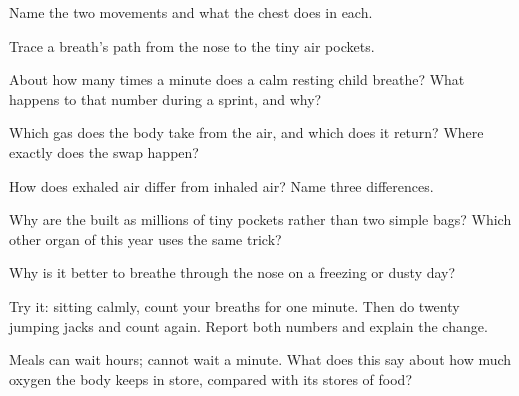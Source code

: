 \begin{exercise}[$\star$]\label{exo:g4:breathing:1}
Name the two  movements and what the chest does in
each.
\end{exercise}

\begin{exercise}[$\star$]\label{exo:g4:breathing:2}
Trace a breath's path from the nose to the tiny air pockets.
\end{exercise}

\begin{exercise}[$\star$]\label{exo:g4:breathing:3}
About how many times a minute does a calm resting child
breathe? What happens to that number during a sprint, and
why?
\end{exercise}

\begin{exercise}[$\star$]\label{exo:g4:breathing:4}
Which gas does the body take from the air, and which does it
return? Where exactly does the swap happen?
\end{exercise}

\begin{exercise}[$\star$]\label{exo:g4:breathing:5}
How does exhaled air differ from inhaled air? Name three
differences.
\end{exercise}

\begin{exercise}[$\star$]\label{exo:g4:breathing:6}
Why are the  built as millions of tiny pockets rather
than two simple bags? Which other organ of this year uses
the same trick?
\end{exercise}

\begin{exercise}[$\star$]\label{exo:g4:breathing:7}
Why is it better to breathe through the nose on a freezing
or dusty day?
\end{exercise}

\begin{exercise}[$\star$]\label{exo:g4:breathing:8}
Try it: sitting calmly, count your breaths for one minute.
Then do twenty jumping jacks and count again. Report both
numbers and explain the change.
\end{exercise}

\begin{exercise}[$\star\star$]\label{exo:g4:breathing:9}
Meals can wait hours;  cannot wait a minute. What
does this say about how much oxygen the body keeps in store,
compared with its stores of food?
\end{exercise}

